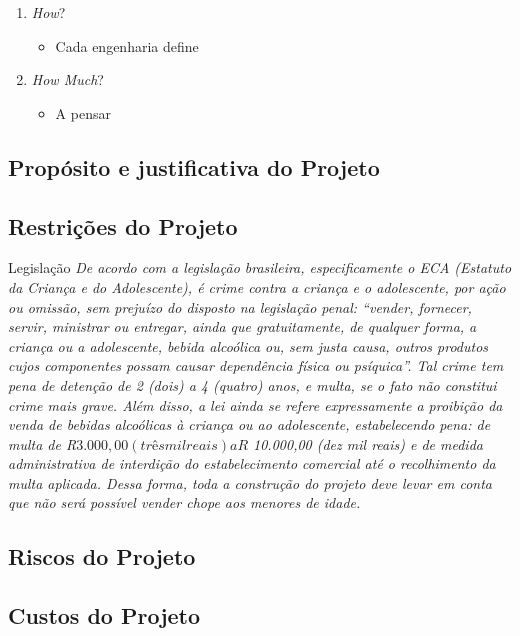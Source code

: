 			\begin{enumerate}
				\item \textit{How}?
					\begin{itemize}
						\item Cada engenharia define
					\end{itemize}
				\item \textit{How Much}?
					\begin{itemize}
						\item A pensar
					\end{itemize}
			\end{enumerate}

		\subsection[Propósito e justificativa do Projeto]{Propósito e justificativa do Projeto}
		
		\subsection[Restrições do Projeto]{Restrições do Projeto}
			Legislação
			\textit{De acordo com a legislação brasileira, especificamente o ECA (Estatuto da Criança e do Adolescente), é crime contra a criança e o adolescente, por ação ou omissão, sem prejuízo do disposto na legislação penal: “vender, fornecer, servir, ministrar ou entregar, ainda que gratuitamente, de qualquer forma, a criança ou a adolescente, bebida alcoólica ou, sem justa causa, outros produtos cujos componentes possam causar dependência física ou psíquica”. Tal crime tem pena de detenção de 2 (dois) a 4 (quatro) anos, e multa, se o fato não constitui crime mais grave. Além disso, a lei ainda se refere expressamente a proibição da venda de bebidas alcoólicas à criança ou ao adolescente, estabelecendo pena: de multa de R$ 3.000,00 (três mil reais) a R$ 10.000,00 (dez mil reais) e de medida administrativa de interdição do estabelecimento comercial até o recolhimento da multa aplicada. Dessa forma, toda a construção do projeto deve levar em conta que não será possível vender chope aos menores de idade.
			}

		\subsection[Riscos do Projeto]{Riscos do Projeto}

		\subsection[Custos do Projeto]{Custos do Projeto}

